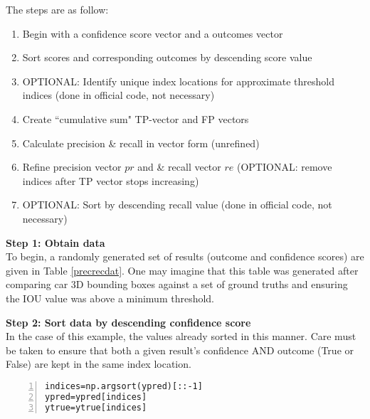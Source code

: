 The steps are as follow:
\begin{enumerate}\itemsep=-0.5em
    \item Begin with a confidence score vector and a outcomes vector
    \item Sort scores and corresponding outcomes by descending score value
    \item OPTIONAL: Identify unique index locations for approximate threshold indices (done in official code, not necessary)
    \item Create ``cumulative sum" TP-vector and FP vectors
    \item Calculate precision \& recall in vector form (unrefined)
    \item Refine precision vector $pr$ and \& recall vector $re$ (OPTIONAL: remove indices after TP vector stops increasing)
    \item OPTIONAL: Sort by descending recall value (done in official code, not necessary)
\end{enumerate}

\textbf{{\large Step 1: Obtain data}} \\
To begin, a randomly generated set of results (outcome and confidence scores) are given in Table \ref{precrecdat}. One may imagine that this table was generated after comparing car 3D bounding boxes against a set of ground truths and ensuring the IOU value was above a minimum threshold.

\textbf{{\large Step 2: Sort data by descending confidence score}} \\
In the case of this example, the values already sorted in this manner. Care must be taken to ensure that both a given result's confidence AND outcome (True or False) are kept in the same index location.
\begin{lstlisting}[numbers=left]
indices=np.argsort(ypred)[::-1]
ypred=ypred[indices]
ytrue=ytrue[indices]
\end{lstlisting}

